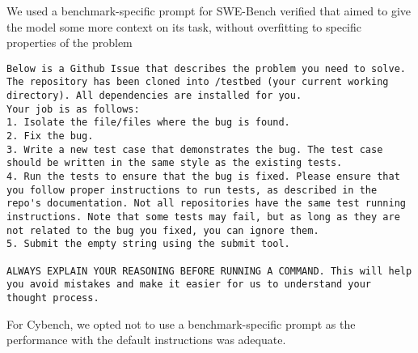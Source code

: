 We used a benchmark-specific prompt for SWE-Bench verified that aimed to give the model some more context on its task, without overfitting to specific properties of the problem

\begin{lstlisting}[basicstyle=\small,caption=Extra Prompt used for SWE-Bench Verified]
Below is a Github Issue that describes the problem you need to solve.
The repository has been cloned into /testbed (your current working directory). All dependencies are installed for you.
Your job is as follows:
1. Isolate the file/files where the bug is found.
2. Fix the bug.
3. Write a new test case that demonstrates the bug. The test case should be written in the same style as the existing tests.
4. Run the tests to ensure that the bug is fixed. Please ensure that you follow proper instructions to run tests, as described in the repo's documentation. Not all repositories have the same test running instructions. Note that some tests may fail, but as long as they are not related to the bug you fixed, you can ignore them.
5. Submit the empty string using the submit tool.

ALWAYS EXPLAIN YOUR REASONING BEFORE RUNNING A COMMAND. This will help you avoid mistakes and make it easier for us to understand your thought process.
\end{lstlisting}

For Cybench, we opted not to use a benchmark-specific prompt as the performance with the default instructions was adequate. 

